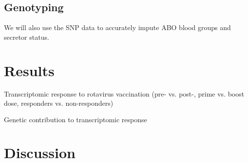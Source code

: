 \subsection{Genotyping}

We will also use the SNP data to accurately impute ABO blood groups and secretor status. 

\section{Results}

Transcriptomic response to rotavirus vaccination (pre- vs. post-, prime vs. boost dose, responders vs. non-responders)

Genetic contribution to transcriptomic response

\section{Discussion}

